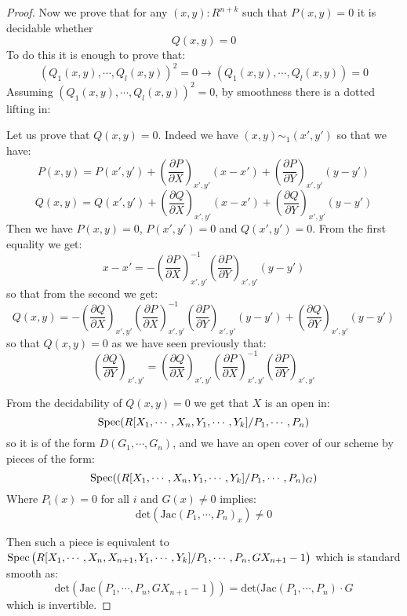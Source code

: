 \begin{proof}
Now we prove that for any $(x,y):R^{n+k}$ such that $P(x,y)=0$ it is decidable whether
\[Q(x,y)=0 \] 
To do this it is enough to prove that:
\[(Q_1(x,y),\cdots,Q_l(x,y))^2=0 \to (Q_1(x,y),\cdots,Q_l(x,y))=0\]
Assuming $(Q_1(x,y),\cdots,Q_l(x,y))^2=0$, by smoothness there is a dotted lifting in:
 \begin{center}
\end{center}
Let us prove that $Q(x,y) = 0$. Indeed we have $(x,y) \sim_1 (x',y')$ so that we have:
\[P(x,y) = P(x',y')+ \left(\frac{\partial P}{\partial X}\right)_{x',y'}(x-x') + \left(\frac{\partial P}{\partial Y}\right)_{x',y'}(y-y') \]
\[Q(x,y) = Q(x',y')+ \left(\frac{\partial Q}{\partial X}\right)_{x',y'}(x-x') + \left(\frac{\partial Q}{\partial Y}\right)_{x',y'}(y-y') \]
Then we have $P(x,y) = 0$, $P(x',y')=0$ and $Q(x',y') = 0$. From the first equality we get:
\[x-x' =  -\left(\frac{\partial P}{\partial X}\right)_{x',y'}^{-1}\left(\frac{\partial P}{\partial Y}\right)_{x',y'}(y-y')\]
so that from the second we get:
\[Q(x,y) = -\left(\frac{\partial Q}{\partial X}\right)_{x',y'}\left(\frac{\partial P}{\partial X}\right)_{x',y'}^{-1}\left(\frac{\partial P}{\partial Y}\right)_{x',y'}(y-y') + \left(\frac{\partial Q}{\partial Y}\right)_{x',y'}(y-y')\]
so that $Q(x,y)=0$ as we have seen previously that:
\[\left(\frac{\partial Q}{\partial Y}\right)_{x',y'} = \left(\frac{\partial Q}{\partial X}\right)_{x',y'}\left(\frac{\partial P}{\partial X}\right)_{x',y'}^{-1} \left(\frac{\partial P}{\partial Y}\right)_{x',y'} \]

From the decidability of $Q(x,y)=0$ we get that $X$ is an open in:
\[\operatorname{Spec}(R[X_1,\cdots,X_n,Y_1,\cdots,Y_k]/P_1,\cdots,P_n)\]
so it is of the form $D(G_1,\cdots,G_n)$, and we have an open cover of our scheme by pieces of the form:
    \[\operatorname{Spec}((R[X_1,\cdots,X_n,Y_1,\cdots,Y_k]/P_1,\cdots,P_n)_G)\]
    Where $P_i(x)=0$ for all $i$ and $G(x)\not=0$ implies:
    \[\mathrm{det}(\mathrm{Jac}(P_1,\cdots,P_n)_x)\not=0\]
 
 Then such a piece is equivalent to $\operatorname{Spec}\big(R[X_1,\cdots,X_n,X_{n+1},Y_1,\cdots,Y_k] / P_1,\cdots,P_n,GX_{n+1}-1\big)$ which is standard smooth as:
 \[\mathrm{det}(\mathrm{Jac}(P_1,\cdots,P_n,GX_{n+1}-1)) = \mathrm{det}(\mathrm{Jac}(P_1,\cdots,P_n) \cdot G\]
 which is invertible.
\end{proof}

